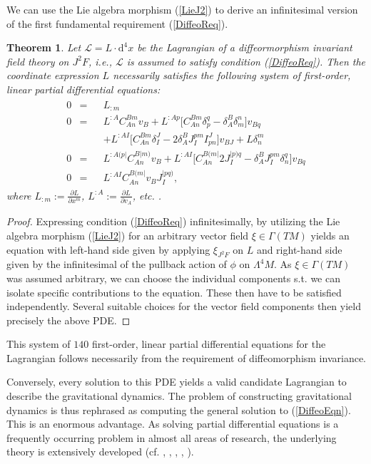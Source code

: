 \documentclass[%
preprint,
nofootinbib,
amsmath,amssymb,
aps,
prd,
floatfix,
]{revtex4-2}
\newtheorem{theorem}{Theorem}
\begin{document}
We can use the Lie algebra morphism (\ref{LieJ2}) to derive an infinitesimal version of the first fundamental requirement (\ref{DiffeoReq}).
\begin{theorem}
Let $\mathcal{L} = L \cdot \mathrm{d}^4x$ be the Lagrangian of a diffeormorphism invariant field theory on $J^2F$, i.e., $\mathcal{L}$ is assumed to satisfy condition (\ref{DiffeoReq}). Then the coordinate expression $L$ necessarily satisfies the following system of first-order, linear partial differential equations:  
\begin{align}\label{DiffeoEqn}
\begin{aligned}
    0 &= &&L_{:m} \\
    0 &= &&L^{:A} C_{An}^{Bm} v_B + L^{:Ap} \bigl[ C_{An}^{Bm} \delta_p^q - \delta_A^B \delta_m^n \bigr] v_{Bq}\\
    & &&+ L^{:AI} \bigl[ C_{An}^{Bm} \delta_I^J - 2 \delta_A^B J_I^{pm} I^J_{pn}  \bigr] v_{BJ} + L \delta^m_n \\
    0 &= &&L^{:A(p\vert}C_{An}^{B \vert m)} v_B + L^{: AI} \bigl[ C_{An}^{B(m\vert} 2 J_I^{\vert p) q} - \delta^B_A J_I ^{pm} \delta_n^q \bigr] v_{Bq} \\
    0 &= &&L^{:AI} C_{An}^{B(m\vert} v_B J_I^{\vert p q )},
\end{aligned}
\end{align}
where $L_{:m} := \frac{\partial L}{\partial x^m}$, $L^{:A} := \frac{\partial L}{ \partial v_A}$, etc. .
\end{theorem}
\begin{proof}
Expressing condition (\ref{DiffeoReq}) infinitesimally, by utilizing the Lie algebra morphism (\ref{LieJ2}) for an arbitrary vector field $\xi \in \Gamma(TM)$ yields an equation with left-hand side given by applying $\xi_{J^2F}$ on $L$ and right-hand side given by the infinitesimal of the pullback action of $\phi$ on $\Lambda^4M$.
As $\xi \in \Gamma(TM)$ was assumed arbitrary, we can choose the individual components s.t. we can isolate specific contributions to the equation. These then have to be satisfied independently. Several suitable choices for the vector field components then yield precisely the above PDE. 
\end{proof}

This system of $140$ first-order, linear partial differential equations for the Lagrangian follows necessarily from the requirement of diffeomorphism invariance. 
\iffalse
Therefore the notoriously difficult requirement of diffeomorphism invariant gravitational dynamics is translated into the much simpler condition that the gravitational Lagrangian be a solution to (\ref{DiffeoEqn}). 
\fi
Conversely, every solution to this PDE yields a valid candidate Lagrangian to describe the gravitational dynamics. 
The problem of constructing gravitational dynamics is thus rephrased as computing the general solution to (\ref{DiffeoEqn}). 
This is an enormous advantage. As solving partial differential equations is a frequently occurring problem in almost all areas of research, the underlying theory is extensively developed (cf. \cite{seiler2009involution}, \cite{hormander1994analysis}, \cite{hormander2009analysis}, \cite{hormander2015analysis}, \cite{Hilbert}).
\end{document}

